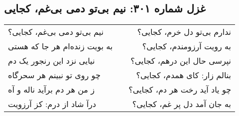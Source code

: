 \begin{center}
\section*{غزل شماره ۳۰۱: نیم بی‌تو دمی بی‌غم، کجایی}
\label{sec:301}
\begin{longtable}{l p{0.5cm} r}
نیم بی‌تو دمی بی‌غم، کجایی؟
&&
ندارم بی‌تو دل خرم، کجایی؟
\\
به بویت زنده‌ام هر جا که هستی
&&
به رویت آرزومندم، کجایی؟
\\
نیایی نزد این رنجور یک دم
&&
نپرسی حال این درهم، کجایی؟
\\
چو روی تو نبینم هر سحرگاه
&&
بنالم زار: کای همدم، کجایی؟
\\
ز من هر دم برآید ناله و آه
&&
چو یاد آید رخت هر دم، کجایی؟
\\
درآ شاد از درم: کز آرزویت
&&
به جان آمد دل پر غم، کجایی؟
\\
\end{longtable}
\end{center}
